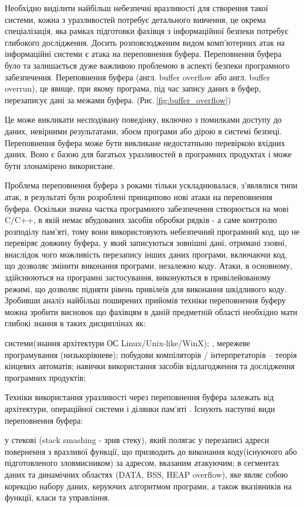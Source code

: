 Необхідно виділити найбільш небезпечні вразливості для створення такої системи, кожна з уразливостей потребує детального вивчення, це окрема спеціалізація,  яка рамках підготовки фахівця з інформаційної безпеки потребує глибокого дослідження.
Досить розповсюдженим видом комп'ютерних атак на інформаційні системи є атака на переповнення буфера.
Переповнення буфера було та залишається дуже важливою проблемою в аспекті безпеки програмного забезпечення. Переповнення буфера (англ. buffer overflow або англ. buffer overrun), це явище, при якому програма, під час запису даних в буфер, перезаписує дані за межами буфера.
(Рис.\,\ref{fig:buffer_overflow})


Це може викликати несподівану поведінку, включно з помилками доступу до даних, невірними результатами, збоєм програми або дірою в системі безпеці.
Переповнення буфера може бути викликане недостатньою перевіркою вхідних даних. Воно є базою для багатьох уразливостей в програмних продуктах і може бути злонамірено використане.

Проблема переповнення буфера з роками тільки ускладнювалася, з'являлися типи атак, в результаті були розроблені принципово нові атаки на переповнення буфера.
Оскільки значна частка програмного забезпечення створюється на мові C/C++, в якій немає вбудованих засобів обробки рядків - а саме контролю розподілу пам’яті, тому вони використовують небезпечний програмний код, що не перевіряє довжину буфера, у який записуються зовнішні дані, отримані ззовні, внаслідок чого можливість перезапису інших даних програми, включаючи код, що дозволяє змінити виконання програми, незалежно коду. Атаки, в основному, здійснюються на програмні застосування, виконуються в привілейованому режимі, що дозволяє підняти рівень привілеїв для виконання шкідливого коду.
Зробивши аналіз найбільш поширених прийомів техніки переповнення буферу можна зробити висновок що фахівцям в даній предметній області необхідно мати глибокі знання в таких дисциплінах як:
\begin{itemize}
 системи(знання архітектури ОС Linux/Unix-like/WinX);
, мережеве програмування (низькорівневе);
 побудови компіляторів / інтерпретаторів – теорія кінцевих автоматів;
 навички використання засобів відлагодження та дослідження програмних продуктів;
\end{itemize}


Техніки використання уразливості через переповнення буфера залежать від архітектури, операційної системи і ділянки пам'яті 
.
Існують наступні види переповнення буфера:
\begin{itemize}
 у стекові (stack smashing - зрив стеку), який полягає у перезаписі адреси повернення з вразливої функції, що призводить до виконання коду(існуючого або підготовленого зловмисником) за адресом, вказаним атакуючим;
 в сегментах даних та динамічних областях (DATA, BSS, HEAP overflow), яке являє собою корекцію набору даних, керуючих алгоритмом програми, а також вказівників на функції, класи та управління. 
\end{itemize}



